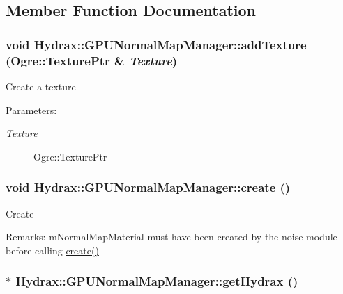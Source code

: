 \subsection{Member Function Documentation}
\hypertarget{class_hydrax_1_1_g_p_u_normal_map_manager_6f1b8618e5a860bbd1300c5beedf1194}{
\subsubsection[{addTexture}]{\setlength{\rightskip}{0pt plus 5cm}void Hydrax::GPUNormalMapManager::addTexture (Ogre::TexturePtr \& {\em Texture})}}
\label{class_hydrax_1_1_g_p_u_normal_map_manager_6f1b8618e5a860bbd1300c5beedf1194}


Create a texture \begin{Desc}
\item[Parameters:]
\begin{description}
\item[{\em Texture}]Ogre::TexturePtr \end{description}
\end{Desc}
\hypertarget{class_hydrax_1_1_g_p_u_normal_map_manager_7398a504e11ea902839868d69bcf956b}{
\subsubsection[{create}]{\setlength{\rightskip}{0pt plus 5cm}void Hydrax::GPUNormalMapManager::create ()}}
\label{class_hydrax_1_1_g_p_u_normal_map_manager_7398a504e11ea902839868d69bcf956b}


Create \begin{Desc}
\item[Remarks:]mNormalMapMaterial must have been created by the noise module before calling \hyperlink{class_hydrax_1_1_g_p_u_normal_map_manager_7398a504e11ea902839868d69bcf956b}{create()} \end{Desc}
\hypertarget{class_hydrax_1_1_g_p_u_normal_map_manager_8252b201663431e9760cf1e9586afc81}{
\subsubsection[{getHydrax}]{$\ast$ Hydrax::GPUNormalMapManager::getHydrax ()}}
\label{class_hydrax_1_1_g_p_u_normal_map_manager_8252b201663431e9760cf1e9586afc81}


